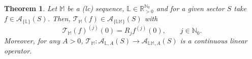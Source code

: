 \documentclass[11pt,a4paper]{article}
\theoremstyle{plain}
\newtheorem{theorem}[proposition]{Theorem}
\theoremstyle{definition}
\newcommand{\RR}{\mathbb{R}}
\newcommand{\NN}{\mathbb{N}}
\newcommand{\M}{\mathbb{M}}
\newcommand{\LL}{\mathbb{L}}
\begin{document}

%	


\begin{theorem}\label{CharacteristicTransform}
 Let $\M$ be a (lc) sequence, $\LL\in\RR_{>0}^{\NN_0}$ and for a given sector $S$ take $f\in \mathcal{A}_{\{\LL\}} (S)$.%
 Then,
$\mathcal{T}_{\M} (f)\in \mathcal{A}_{\{\LL\M\}} (S)$ with
\begin{equation}\label{eq.DerivAt0T_Mf}
\mathcal{T}_{\M} (f)^{(j)}(0)=R_jf^{(j)}(0),\qquad j\in\NN_0.
\end{equation}
Moreover, for any $A>0$, $\mathcal{T}_{\M} : \mathcal{A} _{\LL, A} (S)\rightarrow\mathcal{A}_{\LL\M, A } (S)$ is a continuous linear operator.
\end{theorem}
\end{document}
